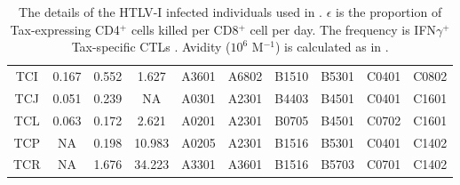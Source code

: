 \begin{table}[htp]
\begin{center}
\begin{sideways}
\begin{tabulary}{1.5\textwidth}{|c|c|c|c|c|c|c|c|c|c|}
TCI & 0.167 & 0.552 & 1.627 & A3601 & A6802 & B1510 & B5301 & C0401 & C0802 \\
TCJ & 0.051 & 0.239 & NA & A0301 & A2301 & B4403 & B4501 & C0401 & C1601 \\
TCL & 0.063 & 0.172 & 2.621 & A0201 & A2301 & B0705 & B4501 & C0702 & C1601 \\
TCP & NA & 0.198 & 10.983 & A0205 & A2301 & B1516 & B5301 & C0401 & C1402 \\
TCR & NA & 1.676 & 34.223 & A3301 & A3601 & B1516 & B5703 & C0701 & C1402 \bigstrut[b] \\
\hline
\end{tabulary}
\end{sideways}

\end{center}
\caption[CD8$^+$ function and MHC class I genotype]{The details of the HTLV-I infected individuals used in . $\epsilon$ is the proportion of Tax-expressing CD4$^+$ cells killed per CD8$^+$ cell per day. The frequency is IFN$\gamma^+$ Tax-specific CTLs \citep{Kattan2009}. Avidity ($10^6$ M$^{-1}$) is calculated as in \citep{Kattan2009}.}
\label{appendixc/table5}
\end{table}

